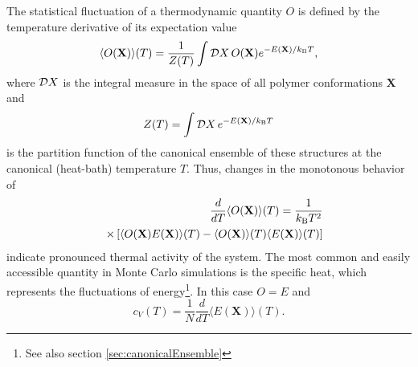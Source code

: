 \documentclass[12pt]{report}
\begin{document}
\newpage
 
The statistical fluctuation of a thermodynamic quantity $O$ is defined by the temperature derivative of its expectation value 
%
\begin{equation}
\langle O(\mathbf{X})\rangle(T)=\frac{1}{Z(T)}\int {\cal D}X\,
O(\mathbf{X}) e^{-E(\mathbf{X})/k_\mathrm{B}T},
\end{equation}
%
where ${\cal D}X$ is the integral measure in the space of all polymer conformations $\mathbf{X}$ and 
%
\begin{equation}
Z(T)=\int {\cal D}X\, e^{-E(\mathbf{X})/k_\mathrm{B}T}
\end{equation}
%
is the partition function of the canonical ensemble of these structures at the canonical (heat-bath) temperature $T$. Thus, changes in the monotonous behavior of 
%
\begin{eqnarray}
&&\hspace*{-7mm}\frac{d}{dT}\langle
O(\mathbf{X})\rangle(T)=\frac{1}{k_\mathrm{B}T^2}
\nonumber\\
&&\times
\left[\langle O(\mathbf{X})E(\mathbf{X})\rangle(T)-\langle
O(\mathbf{X})\rangle(T)\langle E(\mathbf{X})\rangle(T)\right]
\end{eqnarray}
%
indicate pronounced thermal activity of the system. The most common and easily accessible quantity in Monte Carlo simulations is the specific heat, which represents the fluctuations of energy\footnote{See also section\,\,\ref{sec:canonicalEnsemble}}. In this case $O=E$ and
%
\begin{equation}
c_V(T)=\frac{1}{N}\frac{d}{dT}\langle E(\mathbf{X})\rangle(T).
\end{equation}
%
\end{document}
